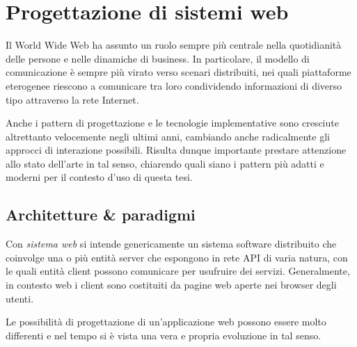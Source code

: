 \chapter{Progettazione di sistemi web}\label{ch:web}
  Il World Wide Web ha assunto un ruolo sempre più centrale nella quotidianità delle persone e nelle dinamiche di business.
  In particolare, il modello di comunicazione è sempre più virato verso scenari distribuiti,
  nei quali piattaforme eterogenee riescono a comunicare tra loro condividendo informazioni di diverso tipo attraverso la rete Internet.

  Anche i pattern di progettazione e le tecnologie implementative sono cresciute altrettanto velocemente negli ultimi anni, cambiando anche radicalmente gli approcci di interazione possibili.
  Risulta dunque importante prestare attenzione allo stato dell'arte in tal senso, chiarendo quali siano i pattern più adatti e moderni per il contesto d'uso di questa tesi.

  \section{Architetture \& paradigmi}\label{sec:web-architecture}

  Con \emph{sistema web} si intende genericamente un sistema software distribuito che coinvolge una o più entità server che espongono in rete API di varia natura, con le quali entità client possono comunicare per usufruire dei servizi.
  Generalmente, in contesto web i client sono costituiti da pagine web aperte nei browser degli utenti.

  Le possibilità di progettazione di un'applicazione web possono essere molto differenti e nel tempo si è vista una vera e propria evoluzione in tal senso.

